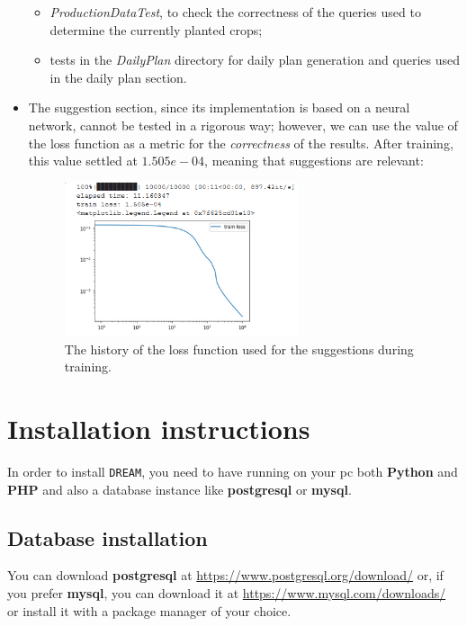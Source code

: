 \documentclass{article}
\begin{document}
\begin{itemize}
\begin{itemize}
        \item \textit{ProductionDataTest}, to check the correctness of the queries used to determine the currently planted crops;
        \item tests in the \textit{DailyPlan} directory for daily plan generation and queries used in the daily plan section.
    \end{itemize}
    \item The suggestion section, since its implementation is based on a neural network, cannot be tested in a rigorous way; however, we can use the value of the loss function as a metric for the \textit{correctness} of the results. After training, this value settled at $1.505e-04$, meaning that suggestions are relevant:
    \begin{figure}[H]
        \centering
        \includegraphics[width=0.65\textwidth]{loss_history_training.png}
        \caption{The history of the loss function used for the suggestions during training.}
        \label{fig:loss}
    \end{figure}
\end{itemize}
\newpage
\section{Installation instructions}
In order to install \verb|DREAM|, you need to have running on your pc both \textbf{Python} and \textbf{PHP} and also a database instance like \textbf{postgresql} or \textbf{mysql}.\\
\subsection{Database installation}
You can download \textbf{postgresql} at \url{https://www.postgresql.org/download/} or, if you prefer \textbf{mysql}, you can download it at \url{https://www.mysql.com/downloads/} or install it with a package manager of your choice.
\end{document}
